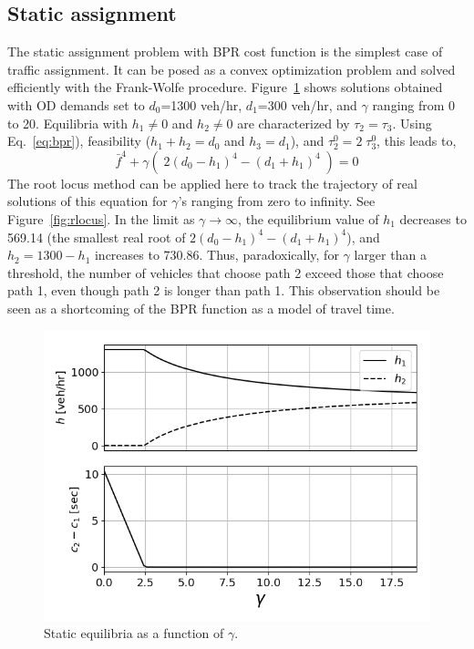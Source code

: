 \subsection{Static assignment}
The static assignment problem with BPR cost function is the simplest case of traffic assignment. It can be posed as a convex optimization problem and solved efficiently with the Frank-Wolfe procedure. Figure~\ref{fig:static} shows solutions obtained with OD demands set to $d_0$=1300 veh/hr, $d_1$=300 veh/hr, and $\gamma$ ranging from 0 to 20. Equilibria with $h_1\neq 0$ and $h_2\neq 0$ are characterized by $\tau_2=\tau_3$. Using Eq.~\ref{eq:bpr}), feasibility ($h_1+h_2=d_0$ and $h_3=d_1$), and $\tau^0_2=2\;\tau^0_3$, this leads to,
\begin{equation}
\bar{f}^4 + \gamma\left(\;2(d_0-h_1)^4 - (d_1+h_1)^4 \;\right) = 0
\end{equation}
The root locus method \cite{rootlocus} can be applied here to track the trajectory of real solutions of this equation for $\gamma$'s ranging from zero to infinity. See Figure~\ref{fig:rlocus}. In the limit as $\gamma\rightarrow\infty$, the equilibrium value of $h_1$ decreases to 569.14 (the smallest real root of $2(d_0-h_1)^4 - (d_1+h_1)^4$), and $h_2=1300-h_1$ increases to 730.86. Thus, paradoxically, for $\gamma$ larger than a threshold, the number of vehicles that choose path 2 exceed those that choose path 1, even though path 2 is longer than path 1. This observation should be seen as a shortcoming of the BPR function as a model of travel time.

\begin{figure}[h]
    \centering
    \includegraphics[width=0.8\linewidth]{figs/static.png}
    \caption{Static equilibria as a function of $\gamma$.}
    \label{fig:static}
\end{figure}

